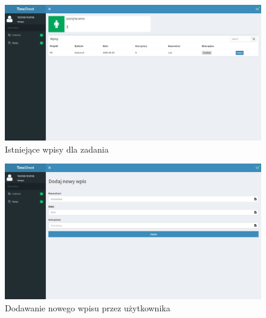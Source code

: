 \documentclass[a4paper, 12pt, oneside]{article}
\begin{document}
		\begin{figure}[H]
			\includegraphics[width=16cm]{userwpisy.jpg}
			\caption{Istniejące wpisy dla zadania}
		\end{figure}
		
		\begin{figure}[H]
			\includegraphics[width=16cm]{usernowywpis.jpg}
			\caption{Dodawanie nowego wpisu przez użytkownika}
		\end{figure}
		\pagebreak
\listoffigures
	
\end{document}
